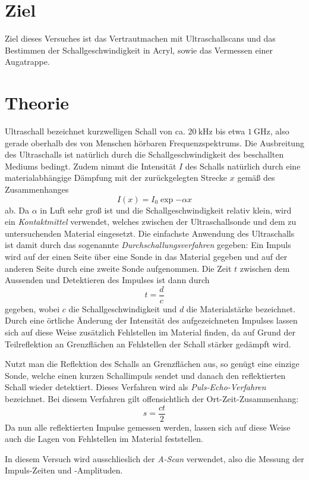 \section{Ziel}
\label{sec:ziel}
Ziel dieses Versuches ist das Vertrautmachen mit Ultraschallscans und das Bestimmen der Schallgeschwindigkeit in Acryl, sowie das Vermessen einer Augatrappe.


\section{Theorie}
\label{sec:Theorie}

Ultraschall bezeichnet kurzwelligen Schall von ca. $\SI{20}{\kilo \hertz}$ bis etwa $\SI{1}{\giga \hertz}$, also gerade oberhalb des von Menschen hörbaren Frequenzspektrums.
Die Ausbreitung des Ultraschalls ist natürlich durch die Schallgeschwindigkeit des beschallten Mediums bedingt. Zudem nimmt die Intensität $I$ des Schalls natürlich durch eine materialabhängige Dämpfung mit der zurückgelegten Strecke $x$ gemäß des Zusammenhanges
\begin{equation}
  I(x) = I_0 \exp{-\alpha x}
  \label{eqn:I}
\end{equation}
ab. Da $\alpha$ in Luft sehr groß ist und die Schallgeschwindigkeit relativ klein, wird ein \textit{Kontaktmittel} verwendet, welches zwischen der Ultraschallsonde und dem zu untersuchenden Material eingesetzt.
Die einfachste Anwendung des Ultraschalls ist damit durch das sogenannte \textit{Durchschallungsverfahren} gegeben: Ein Impuls wird auf der einen Seite über eine Sonde in das Material gegeben und auf der anderen Seite durch eine zweite Sonde aufgenommen. Die Zeit $t$ zwischen dem Aussenden und Detektieren des Impulses ist dann durch
\begin{equation}
  t = \frac{d}{c}
  \label{eqn:durch}
\end{equation}
gegeben, wobei $c$ die Schallgeschwindigkeit und $d$ die Materialstärke bezeichnet. Durch eine örtliche Änderung der Intensität des aufgezeichneten Impulses lassen sich auf diese Weise zusätzlich Fehlstellen im Material finden, da auf Grund der Teilreflektion an Grenzflächen an Fehlstellen der Schall stärker gedämpft wird.

Nutzt man die Reflektion des Schalls an Grenzflächen aus, so genügt eine einzige Sonde, welche einen kurzen Schallimpuls sendet und danach den reflektierten Schall wieder detektiert. Dieses Verfahren wird als \textit{Puls-Echo-Verfahren} bezeichnet. Bei diesem Verfahren gilt offensichtlich der Ort-Zeit-Zusammenhang:
\begin{equation}
  s = \frac{ct}{2}
  \label{eqn:echo}
\end{equation}
Da nun alle reflektierten Impulse gemessen werden, lassen sich auf diese Weise auch die Lagen von Fehlstellen im Material feststellen.

In diesem Versuch wird ausschlieslich der \textit{A-Scan} verwendet, also die Messung der Impuls-Zeiten und -Amplituden.
